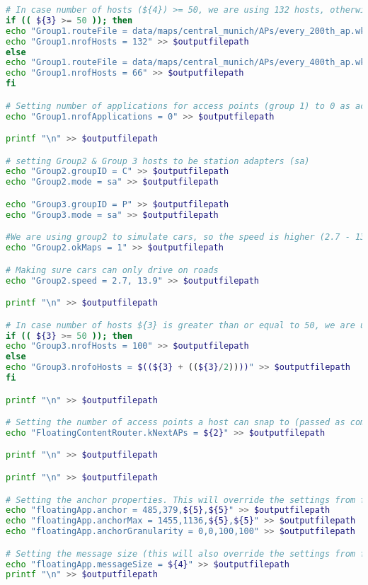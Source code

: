 \begin{lstlisting}[language=bash]
# In case number of hosts (${4}) >= 50, we are using 132 hosts, otherwise we are using 66 hosts for group 1.
if (( ${3} >= 50 )); then
echo "Group1.routeFile = data/maps/central_munich/APs/every_200th_ap.wkt" >> $outputfilepath
echo "Group1.nrofHosts = 132" >> $outputfilepath
else
echo "Group1.routeFile = data/maps/central_munich/APs/every_400th_ap.wkt" >> $outputfilepath
echo "Group1.nrofHosts = 66" >> $outputfilepath
fi

# Setting number of applications for access points (group 1) to 0 as access points don't generate messages.
echo "Group1.nrofApplications = 0" >> $outputfilepath

printf "\n" >> $outputfilepath

# setting Group2 & Group 3 hosts to be station adapters (sa)
echo "Group2.groupID = C" >> $outputfilepath
echo "Group2.mode = sa" >> $outputfilepath

echo "Group3.groupID = P" >> $outputfilepath
echo "Group3.mode = sa" >> $outputfilepath

#We are using group2 to simulate cars, so the speed is higher (2.7 - 13.9 m/s = 10-50 km/h).
echo "Group2.okMaps = 1" >> $outputfilepath

# Making sure cars can only drive on roads
echo "Group2.speed = 2.7, 13.9" >> $outputfilepath

printf "\n" >> $outputfilepath

# In case number of hosts ${3} is greater than or equal to 50, we are using 100 as the total hosts otherwise we are using lesser number of hosts.
if (( ${3} >= 50 )); then
echo "Group3.nrofHosts = 100" >> $outputfilepath
else
echo "Group3.nrofoHosts = $((${3} + ((${3}/2))))" >> $outputfilepath
fi

printf "\n" >> $outputfilepath

# Setting the number of access points a host can snap to (passed as command line argument (${2}))
echo "FloatingContentRouter.kNextAPs = ${2}" >> $outputfilepath

printf "\n" >> $outputfilepath

printf "\n" >> $outputfilepath

# Setting the anchor properties. This will override the settings from floating_app.txt
echo "floatingApp.anchor = 485,379,${5},${5}" >> $outputfilepath
echo "floatingApp.anchorMax = 1455,1136,${5},${5}" >> $outputfilepath
echo "floatingApp.anchorGranularity = 0,0,100,100" >> $outputfilepath

# Setting the message size (this will also override the settings from floating_app.txt)
echo "floatingApp.messageSize = ${4}" >> $outputfilepath
printf "\n" >> $outputfilepath


\end{lstlisting}
